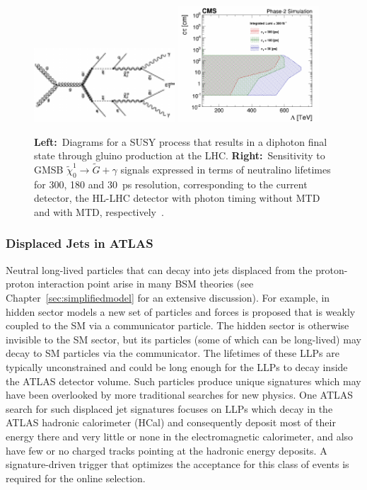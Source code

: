 \begin{figure}[t]\begin{center}
\includegraphics[width=0.47\textwidth]{figures/MTD/diagram.pdf}
\includegraphics[width=0.47\textwidth]{figures/MTD/Limits_excl_2D_ComparingRes.pdf}
\caption{
{\bf Left:}~Diagrams for a SUSY process that results in a diphoton final state through gluino production at the LHC. {\bf Right:}~Sensitivity to GMSB $\tilde{\chi}_0^1 \to \tilde{G} + \gamma$ signals expressed in terms of neutralino lifetimes for 300, 180 and 30~ps resolution, corresponding to the current detector, the HL-LHC detector with photon timing without MTD and with MTD, respectively~\cite{MTD_TP}.
}
\label{fig:cmsupgrade_photon}
\end{center}
\end{figure}

\subsubsection{Displaced Jets in ATLAS}


Neutral long-lived particles that can decay into jets displaced from the proton-proton interaction point arise in many BSM theories (see Chapter~\ref{sec:simplifiedmodel} for an extensive discussion). For example, in hidden sector models a new set of particles and forces is proposed that is weakly coupled to the SM via a communicator particle. The hidden sector is otherwise invisible to the SM sector, but its particles (some of which can be long-lived) may decay to SM particles via the communicator. The lifetimes of these LLPs are typically unconstrained and could be long enough for the LLPs to decay inside the ATLAS detector volume. Such particles produce unique signatures which may have been overlooked by more traditional searches for new physics. One ATLAS search for such displaced jet signatures focuses on LLPs which decay in the ATLAS hadronic calorimeter (HCal) and consequently deposit most of their energy there and very little or none in the electromagnetic calorimeter, and also have few or no charged tracks pointing at the hadronic energy deposits. A signature-driven trigger that optimizes the acceptance for this class of events is required for the online selection.

